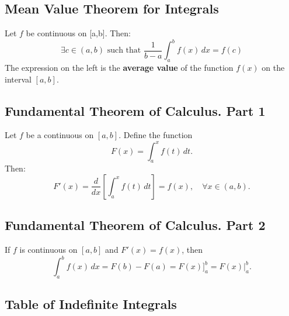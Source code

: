 \documentclass[a4paper,11pt]{article}
\theoremstyle{definition}
\theoremstyle{plain}
\theoremstyle{remark}
\begin{document}


\subsection{Mean Value Theorem for Integrals}

\begin{tcolorbox}
    Let $f$ be continuous on [a,b]. Then:
    \[
    \exists c \in (a,b) \text{ such that } \frac{1}{b - a} \int_{a}^{b} f(x) \, dx = f(c)
    \]
    The expression on the left is the \textbf{average value} of the function $f(x)$ on the interval $[a, b]$.
\end{tcolorbox}




\subsection{Fundamental Theorem of Calculus. Part 1}

\begin{tcolorbox}
    Let $f$ be a continuous on $[a, b]$. Define the function
    \[
    F(x) = \int_{a}^{x} f(t) \, dt.
    \]
    Then:
    \[
    F'(x) = \frac{d}{dx} \left[ \int_{a}^{x} f(t) \, dt \right] = f(x), \quad \forall x \in (a,b).
    \]
\end{tcolorbox}




\subsection{Fundamental Theorem of Calculus. Part 2}

\begin{tcolorbox}
    If $f$ is continuous on $[a,b]$ and $F'(x) = f(x)$, then
    \[
    \int_{a}^{b} f(x) \, dx = F(b) - F(a) =  F(x) \bigg]_{a}^{b} = F(x) \bigg|_{a}^{b}.
    \]
\end{tcolorbox}




\subsection{Table of Indefinite Integrals}
\end{document}
